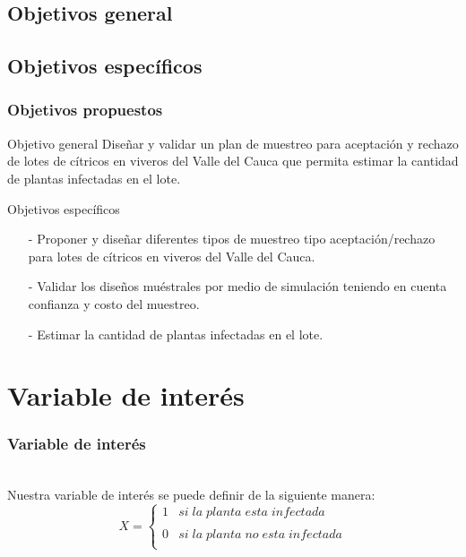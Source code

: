 \documentclass[10pt]{beamer}
\begin{document}
\subsection{Objetivos general}
\subsection{Objetivos específicos}
\begin{frame}
\frametitle{Objetivos propuestos}
\begin{block}{Objetivo general}
Diseñar y validar un plan de muestreo para aceptación y rechazo de lotes de cítricos en viveros del Valle del Cauca que permita estimar la cantidad de plantas infectadas en el lote.
\end{block}
\begin{block}{Objetivos específicos}
\begin{itemize}
\justifying
\item[-]Proponer y diseñar diferentes tipos de muestreo tipo aceptación/rechazo para lotes de cítricos en viveros del Valle del Cauca.
\item[-]Validar los diseños muéstrales por medio de simulación teniendo en cuenta confianza y costo del muestreo.
\item[-]Estimar la cantidad de plantas infectadas en el lote.
\end{itemize}
\end{block}
\end{frame}

\section{Variable de interés}
\begin{frame}
\frametitle{Variable de interés}
~\\Nuestra variable de interés se puede definir de la siguiente manera:
$$X= \left\{\begin{array}{cc}
             1 &   si \; la \; planta \; esta \; infectada \\
             \\ 0 &  si \; la \; planta \; no \; esta \; infectada \\
             \end{array}
   \right.$$
\end{frame}
\end{document}
